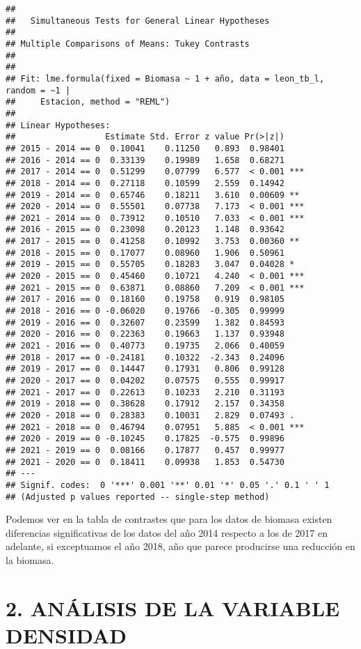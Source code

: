 \documentclass[
]{article}
\begin{document}
\begin{verbatim}
## 
##   Simultaneous Tests for General Linear Hypotheses
## 
## Multiple Comparisons of Means: Tukey Contrasts
## 
## 
## Fit: lme.formula(fixed = Biomasa ~ 1 + año, data = leon_tb_l, random = ~1 | 
##     Estacion, method = "REML")
## 
## Linear Hypotheses:
##                  Estimate Std. Error z value Pr(>|z|)    
## 2015 - 2014 == 0  0.10041    0.11250   0.893  0.98401    
## 2016 - 2014 == 0  0.33139    0.19989   1.658  0.68271    
## 2017 - 2014 == 0  0.51299    0.07799   6.577  < 0.001 ***
## 2018 - 2014 == 0  0.27118    0.10599   2.559  0.14942    
## 2019 - 2014 == 0  0.65746    0.18211   3.610  0.00609 ** 
## 2020 - 2014 == 0  0.55501    0.07738   7.173  < 0.001 ***
## 2021 - 2014 == 0  0.73912    0.10510   7.033  < 0.001 ***
## 2016 - 2015 == 0  0.23098    0.20123   1.148  0.93642    
## 2017 - 2015 == 0  0.41258    0.10992   3.753  0.00360 ** 
## 2018 - 2015 == 0  0.17077    0.08960   1.906  0.50961    
## 2019 - 2015 == 0  0.55705    0.18283   3.047  0.04028 *  
## 2020 - 2015 == 0  0.45460    0.10721   4.240  < 0.001 ***
## 2021 - 2015 == 0  0.63871    0.08860   7.209  < 0.001 ***
## 2017 - 2016 == 0  0.18160    0.19758   0.919  0.98105    
## 2018 - 2016 == 0 -0.06020    0.19766  -0.305  0.99999    
## 2019 - 2016 == 0  0.32607    0.23599   1.382  0.84593    
## 2020 - 2016 == 0  0.22363    0.19663   1.137  0.93948    
## 2021 - 2016 == 0  0.40773    0.19735   2.066  0.40059    
## 2018 - 2017 == 0 -0.24181    0.10322  -2.343  0.24096    
## 2019 - 2017 == 0  0.14447    0.17931   0.806  0.99128    
## 2020 - 2017 == 0  0.04202    0.07575   0.555  0.99917    
## 2021 - 2017 == 0  0.22613    0.10233   2.210  0.31193    
## 2019 - 2018 == 0  0.38628    0.17912   2.157  0.34358    
## 2020 - 2018 == 0  0.28383    0.10031   2.829  0.07493 .  
## 2021 - 2018 == 0  0.46794    0.07951   5.885  < 0.001 ***
## 2020 - 2019 == 0 -0.10245    0.17825  -0.575  0.99896    
## 2021 - 2019 == 0  0.08166    0.17877   0.457  0.99977    
## 2021 - 2020 == 0  0.18411    0.09938   1.853  0.54730    
## ---
## Signif. codes:  0 '***' 0.001 '**' 0.01 '*' 0.05 '.' 0.1 ' ' 1
## (Adjusted p values reported -- single-step method)
\end{verbatim}

Podemos ver en la tabla de contrastes que para los datos de biomasa
existen diferencias significativas de los datos del año 2014 respecto a
los de 2017 en adelante, si exceptuamos el año 2018, año que parece
producirse una reducción en la biomasa.

\hypertarget{anuxe1lisis-de-la-variable-densidad}{%
\section{2. ANÁLISIS DE LA VARIABLE
DENSIDAD}\label{anuxe1lisis-de-la-variable-densidad}}
\end{document}
